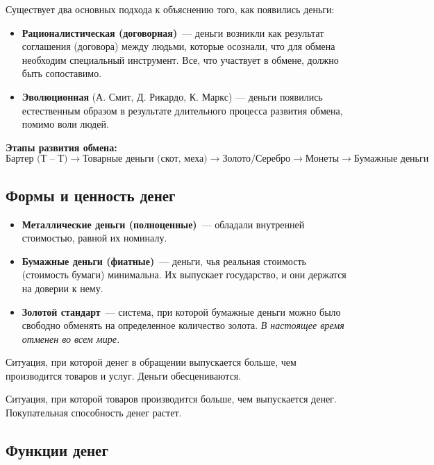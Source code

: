\documentclass[12pt]{article}
\begin{document}
	Существует два основных подхода к объяснению того, как появились деньги:
	
	\begin{itemize}
		\item \textbf{Рационалистическая (договорная)}~--- деньги возникли как результат соглашения (договора) между людьми, которые осознали, что для обмена необходим специальный инструмент. Все, что участвует в обмене, должно быть сопоставимо.
		\item \textbf{Эволюционная} (А. Смит, Д. Рикардо, К. Маркс) — деньги появились естественным образом в результате длительного процесса развития обмена, помимо воли людей. 
	\end{itemize}
	
	\textbf{Этапы развития обмена:}
	\[ \text{Бартер (Т -- Т)} \to \text{Товарные деньги (скот, меха)} \to \text{Золото/Серебро} \to \text{Монеты} \to \text{Бумажные деньги} \]
	
	\subsection{Формы и ценность денег}
	
	\begin{itemize}
		\item \textbf{Металлические деньги (полноценные)}~--- обладали внутренней стоимостью, равной их номиналу.
		\item \textbf{Бумажные деньги (фиатные)}~--- деньги, чья реальная стоимость (стоимость бумаги) минимальна. Их выпускает государство, и они держатся на доверии к нему.
		\item \textbf{Золотой стандарт}~--- система, при которой бумажные деньги можно было свободно обменять на определенное количество золота. \textit{В настоящее время отменен во всем мире.}
	\end{itemize}
	
	\begin{definition}[Инфляция]
		Ситуация, при которой денег в обращении выпускается больше, чем производится товаров и услуг. Деньги обесцениваются.
	\end{definition}
	
	\begin{definition}[Дефляция]
		Ситуация, при которой товаров производится больше, чем выпускается денег. Покупательная способность денег растет.
	\end{definition}
	
	\subsection{Функции денег}
	
\end{document}
